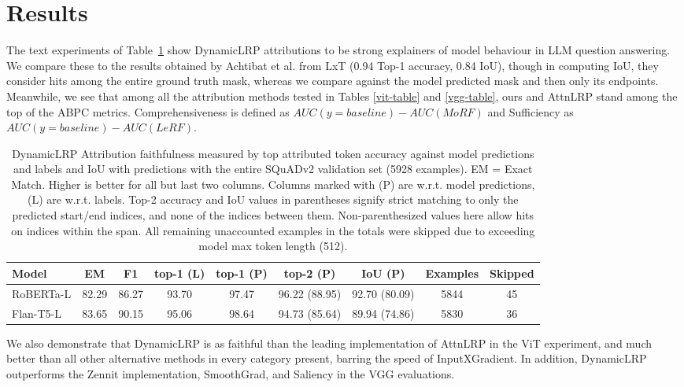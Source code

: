 \documentclass{article}
\begin{document}
\section{Results}
The text experiments of Table~\ref{squadv2-table} show DynamicLRP attributions to be strong explainers of model behaviour in LLM question answering.
We compare these to the results obtained by Achtibat et al. from LxT (0.94 Top-1 accuracy, 0.84 IoU), though in computing IoU, they consider
hits among the entire ground truth mask, whereas we compare against the model predicted mask and then only its endpoints.
Meanwhile, we see that among all the attribution methods tested in Tables \ref{vit-table} and \ref{vgg-table}, ours and AttnLRP stand among the top of the ABPC metrics. Comprehensiveness is defined
as $AUC(y = baseline) - AUC(MoRF)$ and Sufficiency as $AUC(y = baseline) - AUC(LeRF)$.

\begin{table}[!h]
\begin{center}
  \caption{DynamicLRP Attribution faithfulness measured by top attributed token accuracy against model predictions and labels and IoU with
  predictions with the entire SQuADv2 validation set (5928 examples). EM = Exact Match. Higher is better for all but last two columns.
  Columns marked with (P) are w.r.t. model predictions, (L) are w.r.t. labels. Top-2 accuracy and IoU values in parentheses signify strict
  matching to only the predicted start/end indices, and none of the indices between them. Non-parenthesized values here allow hits on indices
  within the span. All remaining unaccounted examples in the totals were skipped due to exceeding model max token length (512).}
  \label{squadv2-table}
  \begin{tabular}{ lcccccccc }
    \toprule
    \textbf{Model} & \textbf{EM} & \textbf{F1} & \textbf{top-1 (L)} & \textbf{top-1 (P)} & \textbf{top-2 (P)} & \textbf{IoU (P)} & \textbf{Examples} & \textbf{Skipped} \\
    \midrule
    RoBERTa-L & 82.29 & 86.27 & 93.70 & 97.47 & 96.22 (88.95) & 92.70 (80.09) & 5844 & 45 \\
    Flan-T5-L & 83.65 & 90.15 & 95.06 & 98.64 & 94.73 (85.64) & 89.94 (74.86) & 5830 & 36 \\
    \bottomrule
  \end{tabular}
\end{center}
\end{table}

We also demonstrate that DynamicLRP is as faithful than the leading implementation of AttnLRP in the ViT experiment,
and much better than all other alternative methods in every category present, barring the speed of InputXGradient.
In addition, DynamicLRP outperforms the Zennit \cite{anders2021zennit} implementation, SmoothGrad, and Saliency in the VGG evaluations.
\end{document}
